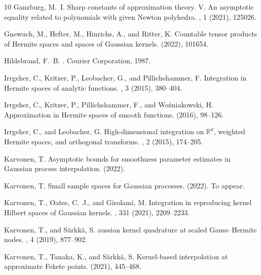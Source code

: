 \documentclass{mcom-l}
\numberwithin{equation}{section}
\numberwithin{theorem}{section} %
\begin{document}
\begin{thebibliography}{10}
{\sc Ganzburg, M.~I.}
\newblock Sharp constants of approximation theory. {V}. {A}n asymptotic
  equality related to polynomials with given {N}ewton polyhedra.
, 1
  (2021), 125026.

{\sc Gnewuch, M., Hefter, M., Hinrichs, A., and Ritter, K.}
\newblock Countable tensor products of {H}ermite spaces and spaces of
  {G}aussian kernels.
 (2022), 101654.

{\sc Hildebrand, F.~B.}
.
\newblock Courier Corporation, 1987.

{\sc Irrgeher, C., Kritzer, P., Leobacher, G., and Pillichshammer, F.}
\newblock Integration in {H}ermite spaces of analytic functions.
, 3 (2015), 380--404.

{\sc Irrgeher, C., Kritzer, P., Pillichshammer, F., and Wo{\'z}niakowski, H.}
\newblock Approximation in {H}ermite spaces of smooth functions.
 (2016), 98--126.

{\sc Irrgeher, C., and Leobacher, G.}
\newblock High-dimensional integration on $\mathbb{R}^d$, weighted {H}ermite
  spaces, and orthogonal transforms.
, 2 (2015), 174--205.

{\sc Karvonen, T.}
\newblock Asymptotic bounds for smoothness parameter estimates in {G}aussian
  process interpolation.
 (2022).

{\sc Karvonen, T.}
\newblock Small sample spaces for {G}aussian processes.
 (2022).
\newblock To appear.

{\sc Karvonen, T., Oates, C.~J., and Girolami, M.}
\newblock Integration in reproducing kernel {H}ilbert spaces of {G}aussian
  kernels.
, 331 (2021), 2209--2233.

{\sc Karvonen, T., and S{\"a}rkk{\"a}, S.}
aussian kernel quadrature at scaled {G}auss--{H}ermite nodes.
, 4 (2019), 877--902.

{\sc Karvonen, T., Tanaka, K., and S{\"a}rkk{\"a}, S.}
\newblock Kernel-based interpolation at approximate {F}ekete points.
 (2021), 445--468.


\end{thebibliography}
\end{document}
